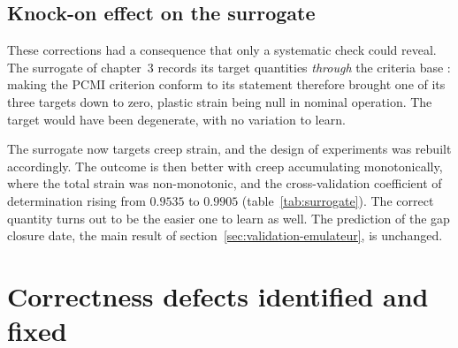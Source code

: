 \documentclass[12pt,a4paper]{report}
\begin{document}
\subsection{Knock-on effect on the surrogate}

These corrections had a consequence that only a systematic check could reveal.
The surrogate of chapter~3 records its target quantities \emph{through} the
criteria base : making the PCMI criterion conform to its statement therefore
brought one of its three targets down to zero, plastic strain being null in
nominal operation. The target would have been degenerate, with no variation to
learn.

The surrogate now targets creep strain, and the design of experiments was
rebuilt accordingly. The outcome is then better with creep accumulating
monotonically, where the total strain was non-monotonic, and the
cross-validation coefficient of determination rising from $0.9535$ to
$\mathbf{0.9905}$ (table~\ref{tab:surrogate}). The correct quantity turns out to
be the easier one to learn as well. The prediction of the gap closure date, the
main result of section~\ref{sec:validation-emulateur}, is unchanged.

\section{Correctness defects identified and fixed}
\label{sec:bugs}
\end{document}
